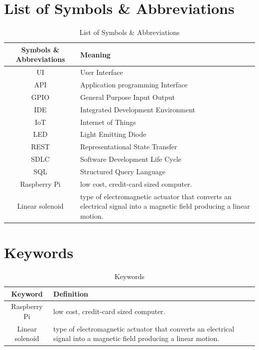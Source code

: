 \documentclass[12pt, oneside, a4paper]{book}
\newcommand\boldcolor[1]{\textcolor{bold}{\textbf{#1}}}
\begin{document}
	\chapter*{List of Symbols \& Abbreviations}
	\label{sec:sym}
	\def\arraystretch{1.5}
	\begin{table}[H]
		\begin{center}
			\begin{tabularx}{\linewidth}{|c|X|}\hline
				
				\boldcolor{Symbols \& Abbreviations} & \boldcolor{Meaning} \\\hline
				UI & User Interface\\\hline
				API & Application programming Interface\\\hline
				GPIO & General Purpose Input Output\\\hline
				IDE & Integrated Development Environment \\\hline
				IoT & Internet of Things \\\hline
				LED & Light Emitting Diode\\\hline
				REST & Representational State Transfer\\\hline
				SDLC & Software Development Life Cycle\\\hline
				SQL & Structured Query Language\\\hline
				Raspberry Pi & low cost, credit-card sized computer\cite{raspberry}. \\\hline
				Linear solenoid &  type of electromagnetic actuator that converts an electrical signal into a magnetic field producing a linear motion\cite{linear}.\\\hline
			\end{tabularx}
		\end{center}
		\caption{List of Symbols \& Abbreviations}
	\end{table}
	\newpage
	\chapter*{Keywords}
	\label{sec:kw}
	\def\arraystretch{1.5}
	\begin{table}[H]
		\begin{center}
			\begin{tabularx}{\linewidth}{|c|X|}\hline		
				\boldcolor{Keyword} & \boldcolor{Definition} \\\hline
				Raspberry Pi & low cost, credit-card sized computer\cite{raspberry}. \\\hline
				Linear solenoid &  type of electromagnetic actuator that converts an electrical signal into a magnetic field producing a linear motion\cite{linear}.\\\hline				
			\end{tabularx}
		\end{center}
		\caption{Keywords}
	\end{table}
	\newpage
\end{document}
